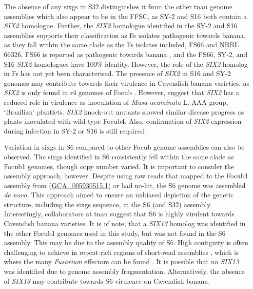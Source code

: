 The absence of any \acp{sixg} in S32 distinguishes it from the other \ac{tnau} genome assemblies which also appear to be in the \ac{FFSC}, as SY-2 and S16 both contain a \textit{SIX2} homologue. Further, the \textit{SIX2} homologue identified in the SY-2 and S16 assemblies supports their classification as \ac{Fs} isolates pathogenic towards banana, as they fall within the same clade as the \ac{Fs} isolates included, FS66 and NRRL 66326. FS66 is reported as pathogenic towards banana \parencite{Cui2021}, and the FS66, SY-2, and S16 \textit{SIX2} homologues have 100\% identity. However, the role of the \textit{SIX2} homolog in \ac{Fs} has not yet been characterised. The presence of \textit{SIX2} in S16 and SY-2 genomes may contribute towards their virulence in Cavendish banana varieties, as \textit{SIX2} is only found in \ac{r4} genomes of \ac{Focub} \parencite{Czislowski2018}. However, \textcite{An2019} suggest that \textit{SIX2} has a reduced role in virulence as inoculation of \textit{Musa acuminata} L. AAA group, ‘Brazilian’ plantlets. \textit{SIX2} knock-out mutants showed similar disease progress as plants inoculated with wild-type \ac{Focub4}. Also, confirmation of \textit{SIX2} expression during infection in SY-2 or S16 is still required. 

Variation in \acp{sixg} in S6 compared to other \ac{Focub} genome assemblies can also be observed. The \acp{sixg} identified in S6 consistently fell within the same clade as \ac{Focub1} genomes, though copy number varied. It is important to consider the assembly approach, however. Despite using raw reads that mapped to the \ac{Focub1} assembly from \textcite{Asai2019} (\href{https://www.ncbi.nlm.nih.gov/datasets/genome/GCA_005930515.1/}{GCA\_005930515.1}) or had no-hit, the S6 genome was assembled \textit{de novo}. This approach aimed to ensure an unbiased depiction of the genetic structure, including the \acp{sixg} sequence, in the S6 (and S32) assembly. Interestingly, collaborators at \ac{tnau} suggest that S6 is highly virulent towards Cavendish banana varieties. It is of note, that a \textit{SIX13} homolog was identified in the other \ac{Focub1} genomes used in this study, but was not found in the S6 assembly.  This may be due to the assembly quality of S6. High contiguity is often challenging to achieve in repeat-rich regions of short-read assemblies \parencite{Treangen2012, Peona2021}, which is where the many \textit{Fusarium} effectors can be found \parencite{Ma2010, Schmidt2013, Armitage2018}. It is possible that no \textit{SIX13} was identified due to genome assembly fragmentation. Alternatively, the absence of \textit{SIX13} may contribute towards S6 virulence on Cavendish banana. 

